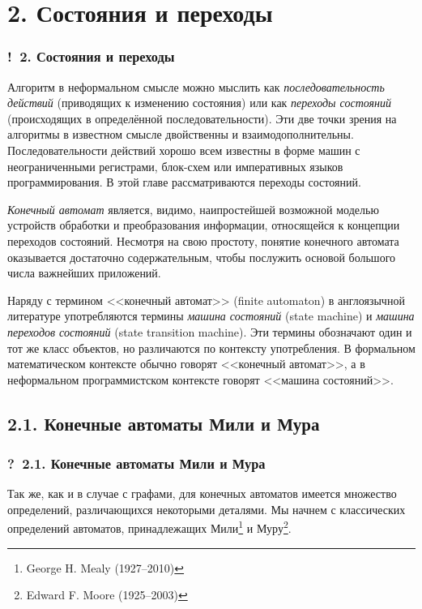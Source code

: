 \documentclass[mathserif,12pt,aspectratio=169]{beamer}
\def\emразделенной{\em разделенной}
\renewcommand{\index}[1]{}
\def\em#1{\it\color{blue}#1}
\def\odmkey#1#2{{\it\color{red} #1}\index{#2}}
\def\Ok{{\color{green}\textbf{!}\ }}
\def\Qm{{\color{brown}\textbf{?}\ }}
\begin{document}
\section{2. Состояния и переходы}
\begin{frame}
\frametitle{\Ok 2. Состояния и переходы}

Алгоритм в неформальном смысле можно мыслить
как {\em последовательность действий} (приводящих к изменению состояния) или 
как {\em переходы состояний} (происходящих в определённой последовательности).
Эти две точки зрения на алгоритмы в известном смысле двойственны и
взаимодополнительны. Последовательности действий хорошо
всем известны в форме машин с неограниченными регистрами, блок-схем или императивных языков программирования.
В этой главе рассматриваются переходы состояний.    

\smallskip
\odmkey{Конечный автомат}{Автомат!конечный} является, видимо, наипростейшей возможной моделью
устройств обработки и преобразования информации, относящейся 
к концепции переходов состояний. Несмотря на свою
простоту, понятие конечного автомата оказывается достаточно
содержательным, чтобы послужить основой большого числа важнейших
приложений.

\smallskip
\begin{remark}
Наряду с термином <<конечный автомат>>
(finite automaton) в англоязычной 
литературе употребляются термины
\odmkey{машина состояний}{Машина!состояний} (state machine)
и 
\odmkey{машина переходов состояний}{Машина!переходов состояний} (state transition machine).
Эти термины обозначают один и тот же класс объектов,
но различаются по контексту употребления.
В формальном математическом контексте 
обычно говорят <<конечный автомат>>, 
а в неформальном программистском контексте
говорят <<машина состояний>>.
\end{remark}

\end{frame}

\subsection{2.1. Конечные автоматы Мили и Мура}\label{2.1}
\begin{frame}
\frametitle{\Qm 2.1. Конечные автоматы Мили и Мура}
Так же, как и в случае с графами, для конечных автоматов имеется
множество определений, различающихся некоторыми деталями. Мы
начнем с классических определений автоматов, принадлежащих
Мили\footnote{George H. Mealy (1927--2010)} и 
Муру\footnote{Edward F. Moore (1925--2003)}.

\end{frame}
\end{document}

